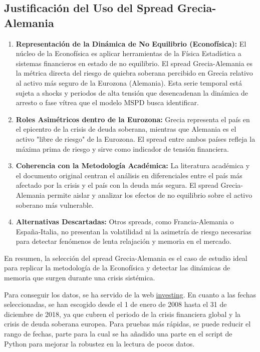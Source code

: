 \documentclass[12pt,a4paper]{article}
\begin{document}
\subsection*{Justificación del Uso del Spread Grecia-Alemania}

\begin{enumerate}[label=\arabic*.]
    \item \textbf{Representación de la Dinámica de No Equilibrio (Econofísica):} El núcleo de la Econofísica es aplicar herramientas de la Física Estadística a sistemas financieros en estado de no equilibrio. El spread Grecia-Alemania es la métrica directa del riesgo de quiebra soberana percibido en Grecia relativo al activo más seguro de la Eurozona (Alemania). Esta serie temporal está sujeta a shocks y periodos de alta tensión que desencadenan la dinámica de arresto o fase vítrea que el modelo MSPD busca identificar.
    \item \textbf{Roles Asimétricos dentro de la Eurozona:} Grecia representa el país en el epicentro de la crisis de deuda soberana, mientras que Alemania es el activo "libre de riesgo" de la Eurozona. El spread entre ambos países refleja la máxima prima de riesgo y sirve como indicador de tensión financiera.
    \item \textbf{Coherencia con la Metodología Académica:} La literatura académica y el documento original centran el análisis en diferenciales entre el país más afectado por la crisis y el país con la deuda más segura. El spread Grecia-Alemania permite aislar y analizar los efectos de no equilibrio sobre el activo soberano más vulnerable.
    \item \textbf{Alternativas Descartadas:} Otros spreads, como Francia-Alemania o España-Italia, no presentan la volatilidad ni la asimetría de riesgo necesarias para detectar fenómenos de lenta relajación y memoria en el mercado.
\end{enumerate}

En resumen, la selección del spread Grecia-Alemania es el caso de estudio ideal para replicar la metodología de la Econofísica y detectar las dinámicas de memoria que surgen durante una crisis sistémica.

Para conseguir los datos, se ha servido de la web \href{https://es.investing.com/rates-bonds/de-10y-vs-gr-10y-historical-data}{investing}. En cuanto a las fechas seleccionadas, se han escogido desde el 1 de enero de 2008 hasta el 31 de diciembre de 2018, ya que cubren el periodo de la crisis financiera global y la crisis de deuda soberana europea. Para pruebas más rápidas, se puede reducir el rango de fechas, parte para la cual se ha añadido una parte en el script de Python para mejorar la robustez en la lectura de pocos datos.
\end{document}

